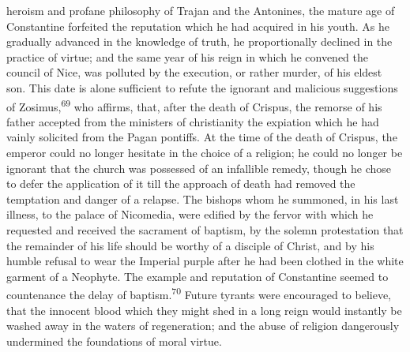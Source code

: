 heroism and profane philosophy of Trajan and the Antonines, the mature
age of Constantine forfeited the reputation which he had acquired in
his youth. As he gradually advanced in the knowledge of truth, he
proportionally declined in the practice of virtue; and the same year of
his reign in which he convened the council of Nice, was polluted by the
execution, or rather murder, of his eldest son. This date is alone
sufficient to refute the ignorant and malicious suggestions of Zosimus,\textsuperscript{69}
who affirms, that, after the death of Crispus, the remorse of his
father accepted from the ministers of christianity the expiation which
he had vainly solicited from the Pagan pontiffs. At the time of the
death of Crispus, the emperor could no longer hesitate in the choice of
a religion; he could no longer be ignorant that the church was
possessed of an infallible remedy, though he chose to defer the
application of it till the approach of death had removed the temptation
and danger of a relapse. The bishops whom he summoned, in his last
illness, to the palace of Nicomedia, were edified by the fervor with
which he requested and received the sacrament of baptism, by the solemn
protestation that the remainder of his life should be worthy of a
disciple of Christ, and by his humble refusal to wear the Imperial
purple after he had been clothed in the white garment of a Neophyte.
The example and reputation of Constantine seemed to countenance the
delay of baptism.\textsuperscript{70} Future tyrants were encouraged to believe, that
the innocent blood which they might shed in a long reign would
instantly be washed away in the waters of regeneration; and the abuse
of religion dangerously undermined the foundations of moral virtue.


